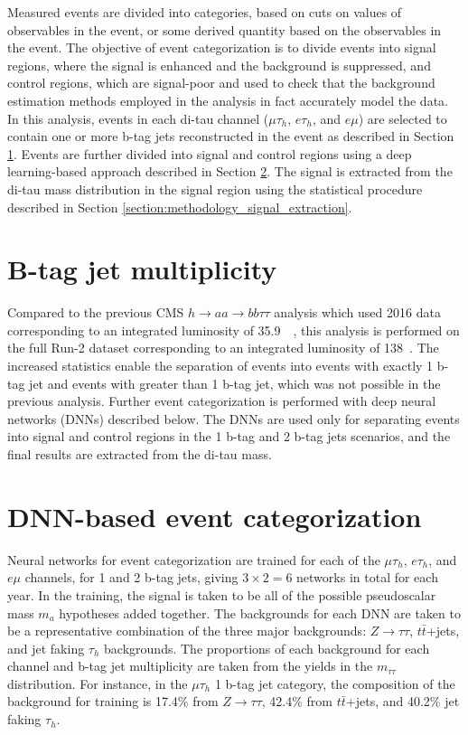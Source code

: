 Measured events are divided into categories, based on cuts on values of observables in the event, or some derived quantity based on the observables in the event. The objective of event categorization is to divide events into signal regions, where the signal is enhanced and the background is suppressed, and control regions, which are signal-poor and used to check that the background estimation methods employed in the analysis in fact accurately model the data. In this analysis, events in each di-tau channel ($\mu\tau_{h}$, $e\tau_{h}$, and $e\mu$) are selected to contain one or more b-tag jets reconstructed in the event as described in Section \ref{section:event-categorization-b-tag-jet}. Events are further divided into signal and control regions using a deep learning-based approach described in Section \ref{section:DNN-event-categorization}. The signal is extracted from the di-tau mass distribution in the signal region using the statistical procedure described in Section \ref{section:methodology_signal_extraction}.

\section{B-tag jet multiplicity}
\label{section:event-categorization-b-tag-jet}
Compared to the previous CMS $h \rightarrow aa \rightarrow bb\tau\tau$ analysis which used 2016 data corresponding to an integrated luminosity of 35.9~\fbinv~\cite{CMS-HIG-17-024}, this analysis is performed on the full Run-2 dataset corresponding to an integrated luminosity of 138~\fbinv. The increased statistics enable the separation of events into events with exactly 1 b-tag jet and events with greater than 1 b-tag jet, which was not possible in the previous analysis. Further event categorization is performed with deep neural networks (DNNs) described below. The DNNs are used only for separating events into signal and control regions in the 1 b-tag and 2 b-tag jets scenarios, and the final results are extracted from the di-tau mass.

\section{DNN-based event categorization}
\label{section:DNN-event-categorization}
Neural networks for event categorization are trained for each of the $\mu\tau_{h}$, $e\tau_{h}$, and $e\mu$ channels, for 1 and 2 b-tag jets, giving $3 \times 2 = 6$ networks in total for each year. In the training, the signal is taken to be all of the possible pseudoscalar mass $m_{a}$ hypotheses added together. The backgrounds for each DNN are taken to be a representative combination of the three major backgrounds: $Z \rightarrow \tau\tau$, $t\bar{t}$+jets, and jet faking $\tau_{h}$ backgrounds. The proportions of each background for each channel and b-tag jet multiplicity are taken from the yields in the $m_{\tau\tau}$ distribution. For instance, in the $\mu\tau_{h}$ 1 b-tag jet category, the composition of the background for training is 17.4\% from $Z \rightarrow \tau\tau$, 42.4\% from $t\bar{t}$+jets, and 40.2\% jet faking $\tau_{h}$. 

